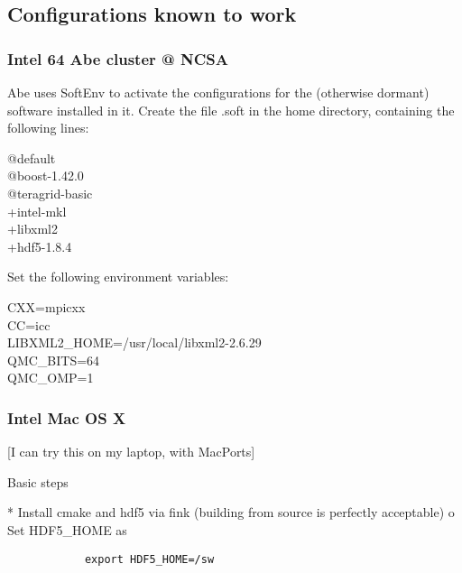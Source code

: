 
\subsection{Configurations known to work}
\subsubsection{Intel 64 Abe cluster @ NCSA}
Abe uses SoftEnv to activate the configurations for the (otherwise dormant) software installed in it.  Create the file .soft in the home directory, containing the following lines:
\begin{console}
@default\\
@boost-1.42.0\\
@teragrid-basic\\
+intel-mkl\\
+libxml2\\
+hdf5-1.8.4
\end{console}
Set the following environment variables:
\begin{console}
CXX=mpicxx\\
CC=icc\\
LIBXML2\_HOME=/usr/local/libxml2-2.6.29\\
QMC\_BITS=64\\
QMC\_OMP=1
\end{console}

\subsubsection{Intel Mac OS X}
[I can try this on my laptop, with MacPorts]

Basic steps

    * Install cmake and hdf5 via fink (building from source is perfectly acceptable)
          o Set HDF5\_HOME as

\begin{verbatim}
            export HDF5_HOME=/sw
\end{verbatim}

